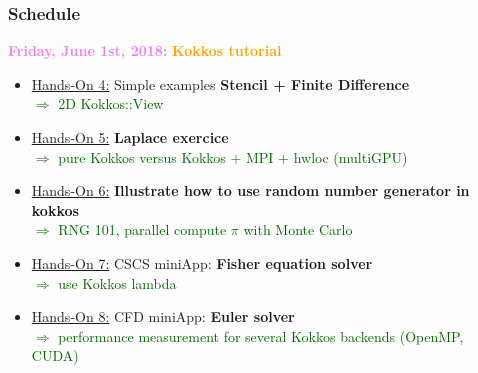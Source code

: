 \begin{frame}
  \frametitle{Schedule}

  {\bf \large \textcolor{violet}{Friday, June 1st, 2018:}} \textcolor{orange}{\bf Kokkos tutorial}
  \begin{itemize}
  \item \textcolor{blue}{\hyperlink{handson4}{Hands-On 4:}} Simple examples \textbf{Stencil + Finite Difference}\\
    \textcolor{darkgreen}{$\Rightarrow$ 2D Kokkos::View}
  \item \textcolor{blue}{\hyperlink{handson5}{Hands-On 5:}} \textbf{Laplace exercice}\\
    \textcolor{darkgreen}{$\Rightarrow$ pure Kokkos versus Kokkos + MPI + hwloc (multiGPU)}
  \item \textcolor{blue}{\hyperlink{handson6}{Hands-On 6:}} \textbf{Illustrate how to use random number generator in kokkos}\\
    \textcolor{darkgreen}{$\Rightarrow$ RNG 101, parallel compute $\pi$ with Monte Carlo}
  \item \textcolor{blue}{\hyperlink{handson7}{Hands-On 7:}} CSCS miniApp: \textbf{Fisher equation solver}\\
    \textcolor{darkgreen}{$\Rightarrow$ use Kokkos lambda}
  \item \textcolor{blue}{\hyperlink{handson8}{Hands-On 8:}} CFD miniApp: \textbf{Euler solver}\\
    \textcolor{darkgreen}{$\Rightarrow$ performance measurement for several Kokkos backends (OpenMP, CUDA)}
  \end{itemize}
\end{frame}
